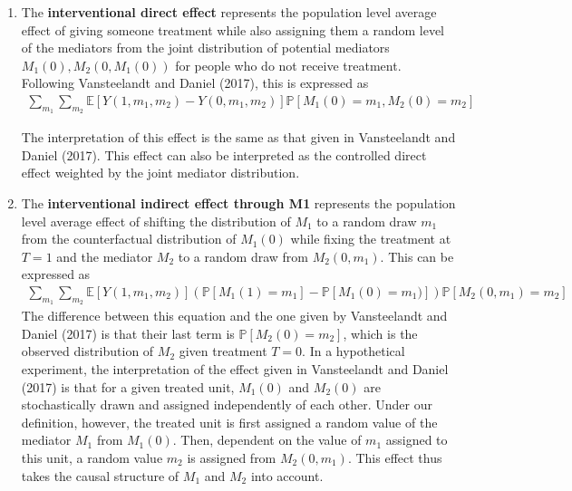 \documentclass[12pt]{article} %
\numberwithin{equation}{section} %
\begin{document}
\begin{enumerate}
    \item The \textbf{interventional direct effect} represents the population level average effect of giving someone treatment while also assigning them a random level of the mediators from the joint distribution of potential mediators $M_{1}(0), M_{2}(0,M_{1}(0))$ for people who do not receive treatment. Following Vansteelandt and Daniel (2017), this is expressed as
    \begin{align*}
    \sum_{m_{1}} \sum_{m_{2}} \mathbb{E}[Y(1,m_{1},m_{2}) - Y(0,m_{1},m_{2})]\mathbb{P}[M_{1}(0) = m_{1}, M_{2}(0)=m_{2}]
    \end{align*}

    The interpretation of this effect is the same as that given in Vansteelandt and Daniel (2017). This effect can also be interpreted as the controlled direct effect weighted by the joint mediator distribution. 
    
    \item The \textbf{interventional indirect effect through M1} represents the population level average effect of shifting the distribution of $M_{1}$ to a random draw $m_{1}$ from the counterfactual distribution of $M_{1}(0)$ while fixing the treatment at $T=1$ and the mediator $M_{2}$ to a random draw from $M_{2}(0,m_{1})$. This can be expressed as
    \begin{align*}
     \sum_{m_{1}} \sum_{m_{2}} \mathbb{E}[Y(1,m_{1},m_{2})](\mathbb{P}[M_{1}(1) = m_{1}] -
     \mathbb{P}[M_{1}(0)=m_{1})])\mathbb{P}[M_{2}(0,m_{1})=m_{2}]
    \end{align*}
    The difference between this equation and the one given by Vansteelandt and Daniel (2017) is that their last term is $\mathbb{P}[M_{2}(0)=m_{2}]$, which is the observed distribution of $M_{2}$ given treatment $T=0$. In a hypothetical experiment, the interpretation of the effect given in Vansteelandt and Daniel (2017) is that for a given treated unit, $M_{1}(0)$ and $M_{2}(0)$ are 
    stochastically drawn and assigned independently of each other. Under our definition, however, the treated unit is first assigned a random value of the mediator $M_{1}$ from $M_{1}(0)$. Then, dependent on the value of $m_{1}$ assigned to this unit, a random value $m_{2}$ is assigned from $M_{2}(0,m_{1})$. This effect thus takes the causal structure of $M_{1}$ and $M_{2}$ into account. 
    

\end{enumerate}
\end{document}

